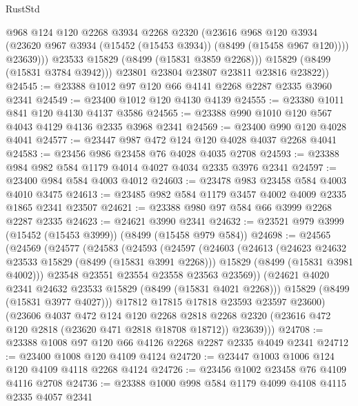 \begin{lexlean}{RustStd}
\begin{coremodule}
                  @968
                  @124
                  @120
                  @2268
                  @3934
                  @2268
                  @2320
                  (@23616
                    @968
                    @120
                    @3934
                    (@23620 @967 @3934 (@15452 (@15453 @3934)) (@8499 (@15458 @967 @120))))
                  @23639)))
            @23533
            @15829
            (@8499 (@15831 @3859 @2268)))
          @15829
          (@8499 (@15831 @3784 @3942)))
        @23801
        @23804
        @23807
        @23811
        @23816
        @23822))
@24545 := @23388 @1012 @97 @120 @66 @4141 @2268 @2287 @2335 @3960 @2341
@24549 := @23400 @1012 @120 @4130 @4139
@24555 := @23380 @1011 @841 @120 @4130 @4137 @3586
@24565 := @23388 @990 @1010 @120 @567 @4043 @4129 @4136 @2335 @3968 @2341
@24569 := @23400 @990 @120 @4028 @4041
@24577 := @23447 @987 @472 @124 @120 @4028 @4037 @2268 @4041
@24583 := @23456 @986 @23458 @76 @4028 @4035 @2708
@24593 := @23388 @984 @982 @584 @1179 @4014 @4027 @4034 @2335 @3976 @2341
@24597 := @23400 @984 @584 @4003 @4012
@24603 := @23478 @983 @23458 @584 @4003 @4010 @3475
@24613 := @23485 @982 @584 @1179 @3457 @4002 @4009 @2335 @1865 @2341 @23507
@24621 := @23388 @980 @97 @584 @66 @3999 @2268 @2287 @2335
@24623 := @24621 @3990 @2341
@24632 := @23521 @979 @3999 (@15452 (@15453 @3999)) (@8499 (@15458 @979 @584))
@24698 := @24565
    (@24569
      (@24577
        (@24583
          (@24593
            (@24597
              (@24603
                (@24613
                  (@24623 @24632 @23533 @15829 (@8499 (@15831 @3991 @2268)))
                  @15829
                  (@8499 (@15831 @3981 @4002)))
                @23548
                @23551
                @23554
                @23558
                @23563
                @23569))
            (@24621 @4020 @2341 @24632 @23533 @15829 (@8499 (@15831 @4021 @2268)))
            @15829
            (@8499 (@15831 @3977 @4027)))
          @17812
          @17815
          @17818
          @23593
          @23597
          @23600)
        (@23606
          @4037
          @472
          @124
          @120
          @2268
          @2818
          @2268
          @2320
          (@23616 @472 @120 @2818 (@23620 @471 @2818 @18708 @18712))
          @23639)))
@24708 := @23388 @1008 @97 @120 @66 @4126 @2268 @2287 @2335 @4049 @2341
@24712 := @23400 @1008 @120 @4109 @4124
@24720 := @23447 @1003 @1006 @124 @120 @4109 @4118 @2268 @4124
@24726 := @23456 @1002 @23458 @76 @4109 @4116 @2708
@24736 := @23388 @1000 @998 @584 @1179 @4099 @4108 @4115 @2335 @4057 @2341

\end{coremodule}
\end{lexlean}
